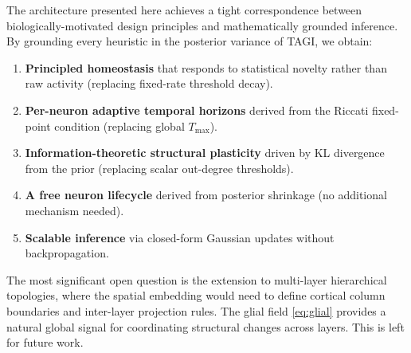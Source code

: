 \documentclass[12pt, a4paper]{article}
\begin{document}
The architecture presented here achieves a tight correspondence between
biologically-motivated design principles and mathematically grounded inference. By
grounding every heuristic in the posterior variance of TAGI, we obtain:

\begin{enumerate}
    \item \textbf{Principled homeostasis} that responds to statistical novelty rather
    than raw activity (replacing fixed-rate threshold decay).

    \item \textbf{Per-neuron adaptive temporal horizons} derived from the Riccati
    fixed-point condition (replacing global $T_{\max}$).

    \item \textbf{Information-theoretic structural plasticity} driven by KL divergence
    from the prior (replacing scalar out-degree thresholds).

    \item \textbf{A free neuron lifecycle} derived from posterior shrinkage (no
    additional mechanism needed).

    \item \textbf{Scalable inference} via closed-form Gaussian updates without
    backpropagation.
\end{enumerate}

The most significant open question is the extension to multi-layer hierarchical
topologies, where the spatial embedding would need to define cortical column boundaries
and inter-layer projection rules. The glial field \eqref{eq:glial} provides a natural
global signal for coordinating structural changes across layers. This is left for future
work.



\end{document}
